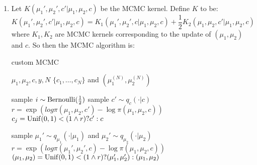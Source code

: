 \documentclass{article}
\begin{document}



\begin{enumerate}
\item 
Let $K(\mu_1', \mu_2', c' | \mu_1, \mu_2, c)$ be the MCMC kernel. Define $K$ to be:
\[K(\mu_1', \mu_2', c' | \mu_1, \mu_2, c) = K_1(\mu_1', \mu_2', c | \mu_1, \mu_2, c) + \frac12 K_2(\mu_1, \mu_2, c' | \mu_1, \mu_2, c)\]where $K_1, K_2$ are MCMC kernels corresponding to the update of $(\mu_1, \mu_2)$ and $c$. So then the MCMC algorithm is:
\begin{algorithm}
    \caption{custom MCMC}
    \label{algo:mixture}
    \begin{algorithmic}[1]
        \Require $\mu_1, \mu_2, c, y, N$
        \Ensure $\{c_1, \ldots, c_N\}$ and $(\mu_1^{(N)}, \mu_2^{(N)})$

        \State sample $i \sim \operatorname{Bernoulli}(\frac12)$
        \State sample $c' \sim q_c( \cdot | c)$
        \State $r = \exp(log\pi(\mu_1, \mu_2, c') - \log\pi(\mu_1, \mu_2, c))$
        \State $c_j = \operatorname{Unif}(0,1) < (1 \wedge r) ? c' : c$

        \Else 
        \State sample $\mu_1' \sim q_{\mu_1}(\cdot | \mu_1)$ and $\mu_2' \sim q_{\mu_2}(\cdot | \mu_2)$
        \State $r = \exp(log\pi(\mu_1', \mu_2', c) - \log\pi(\mu_1, \mu_2, c))$
        \State $(\mu_1, \mu_2) = \operatorname{Unif}(0,1) < (1 \wedge r) ? (\mu_1', \mu_2') : (\mu_1, \mu_2)$

        \EndIf
        \EndFor
    \end{algorithmic}

\end{algorithm}




\end{enumerate}
\end{document}
